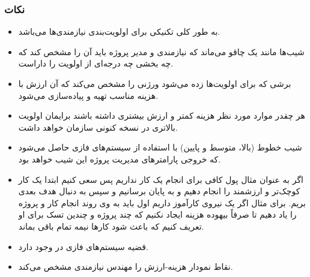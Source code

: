 \subsubsection*{نکات}

\begin{itemize}
    \item به طور کلی  تکنیکی برای اولویت‌بندی نیازمندی‌ها می‌باشد.
    \item شیب‌ها مانند یک چاقو می‌ماند که نیازمندی و مدیر پروژه باید آن را مشخص
    کند که چه بخشی چه درجه‌ای از اولویت را داراست.
    \item برشی که برای اولویت‌ها زده می‌شود ورژنی را مشخص می‌کند که آن ارزش با
    هزینه مناسب تهیه و پیاده‌سازی می‌شود.
    \item هر چقدر موارد مورد نظر هزینه کمتر و ارزش بیشتری داشته باشند برایمان
    اولویت بالاتری در نسخه کنونی سازمان خواهد داشت.
    \item شیب خطوط (بالا، متوسط و پایین) با استفاده از سیستم‌های فازی حاصل
    می‌شود که خروجی پارامتر‌های مدیریت پروژه این شیب خواهد بود.
    \item اگر به عنوان مثال پول کافی برای انجام یک کار نداریم پس سعی کنیم ابتدا
    یک کار کوچک‌تر و ارزشمند را انجام دهیم و به پایان برسانیم و سپس به دنبال هدف
    بعدی بریم. برای مثال اگر یک نیروی کارآموز داریم اول باید به وی روند انجام
    کار و پروژه را یاد دهیم تا صرفاً بیهوده هزینه ایجاد نکنیم که چند پروژه و
    چندین تسک برای او تعریف کنیم که باعث شود کار‌ها نیمه تمام باقی بماند.
    \item قضیه سیستم‌های فازی در  وجود دارد.
    \item نقاط نمودار هزینه-ارزش را مهندس نیازمندی مشخص می‌کند.
\end{itemize}
